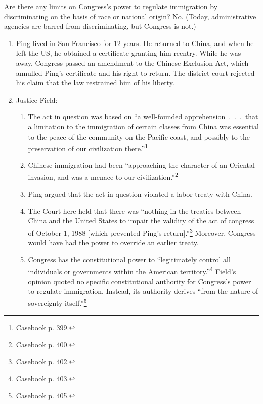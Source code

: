 Are there any limits on Congress's power to regulate immigration by 
discriminating on the basis of race or national origin? No. (Today, 
administrative agencies are barred from discriminating, but Congress is not.)

\begin{enumerate}
    \item Ping lived in San Francisco for 12 years. He returned to China, and 
    when he left the US, he obtained a certificate granting him reentry. While 
    he was away, Congress passed an amendment to the Chinese Exclusion Act, 
    which annulled Ping's certificate and his right to return. The district 
    court rejected his claim that the law restrained him of his liberty.
    \item Justice Field:
    \begin{enumerate}
        \item The act in question was based on ``a well-founded 
        apprehension~.~.~.~that a limitation to the immigration of certain 
        classes from China was essential to the peace of the community on the 
        Pacific coast, and possibly to the preservation of our civilization 
        there.''\footnote{Casebook p. 399.}
        \item Chinese immigration had been ``approaching the character of an 
        Oriental invasion, and was a menace to our 
        civilization.''\footnote{Casebook p. 400.}
        \item Ping argued that the act in question violated a labor treaty 
        with China.
        \item The Court here held that there was ``nothing in the treaties 
        between China and the United States to impair the validity of the act 
        of congress of October 1, 1988 [which prevented Ping's 
        return].''\footnote{Casebook p. 402.} Moreover, Congress would have 
        had the power to override an earlier treaty.
        \item Congress has the constitutional power to ``legitimately control 
        all individuals or governments within the American 
        territory.''\footnote{Casebook p.  403.} Field's opinion 
        quoted no specific constitutional authority for Congress's power to 
        regulate immigration. Instead, its authority derives ``from the nature 
        of sovereignty itself.''\footnote{Casebook p. 405.}
    \end{enumerate}
\end{enumerate}

